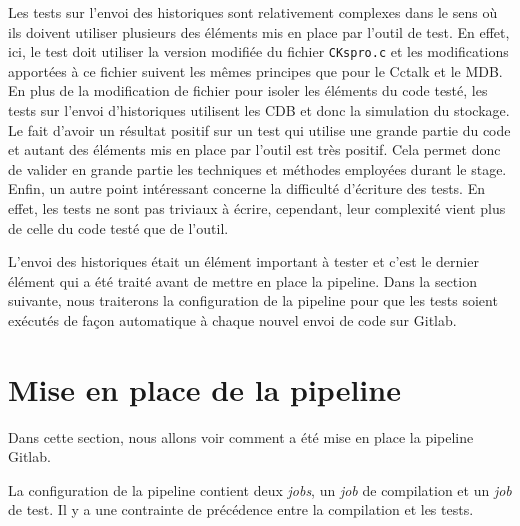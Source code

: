 \documentclass[a4paper]{article}
\begin{document}
Les tests sur l'envoi des historiques sont relativement complexes dans le sens
où ils doivent utiliser plusieurs des éléments mis en place par l'outil de test.
En effet, ici, le test doit utiliser la version modifiée du fichier
\verb|CKspro.c| et les modifications apportées à ce fichier suivent les mêmes
principes que pour le Cctalk et le MDB. En plus de la modification de fichier
pour isoler les éléments du code testé, les tests sur l'envoi d'historiques
utilisent les CDB et donc la simulation du stockage. Le fait d'avoir un résultat
positif sur un test qui utilise une grande partie du code et autant des éléments
mis en place par l'outil est très positif. Cela permet donc de valider en grande
partie les techniques et méthodes employées durant le stage. Enfin, un autre
point intéressant concerne la difficulté d'écriture des tests. En effet, les
tests ne sont pas triviaux à écrire, cependant, leur complexité vient plus de
celle du code testé que de l'outil.

L'envoi des historiques était un élément important à tester et c'est le dernier
élément qui a été traité avant de mettre en place la pipeline. Dans la section
suivante, nous traiterons la configuration de la pipeline pour que les tests
soient exécutés de façon automatique à chaque nouvel envoi de code sur Gitlab.
\section{Mise en place de la pipeline}%

Dans cette section, nous allons voir comment a été mise en place la pipeline
Gitlab.

La configuration de la pipeline contient deux \textit{jobs}, un \textit{job} de
compilation et un \textit{job} de test. Il y a une contrainte de précédence
entre la compilation et les tests.
\end{document}
